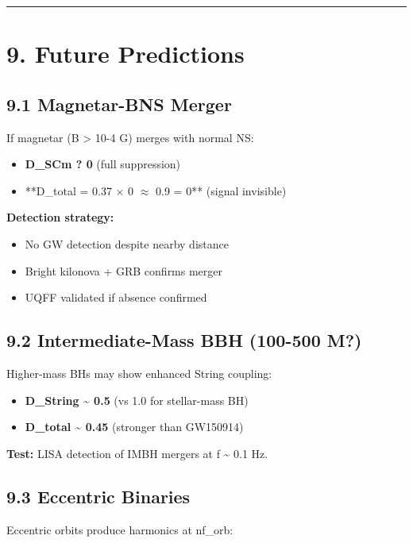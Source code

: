 \documentclass[11pt]{article}
\begin{document}
\noindent\rule{\textwidth}{0.4pt}

\section*{9. Future Predictions}

\subsection*{9.1 Magnetar-BNS Merger}

If magnetar (B > 10-4 G) merges with normal NS:

\begin{itemize}
  \item \textbf{D\_SCm ? 0} (full suppression)
  \item **D\_total = 0.37 $\times$ 0 $\approx$ 0.9 = 0** (signal invisible)
\end{itemize}

\textbf{Detection strategy:}

\begin{itemize}
  \item No GW detection despite nearby distance
  \item Bright kilonova + GRB confirms merger
  \item UQFF validated if absence confirmed
\end{itemize}

\subsection*{9.2 Intermediate-Mass BBH (100-500 M?)}

Higher-mass BHs may show enhanced String coupling:

\begin{itemize}
  \item \textbf{D\_String \textasciitilde{} 0.5} (vs 1.0 for stellar-mass BH)
  \item \textbf{D\_total \textasciitilde{} 0.45} (stronger than GW150914)
\end{itemize}

\textbf{Test:} LISA detection of IMBH mergers at f \textasciitilde{} 0.1 Hz.

\subsection*{9.3 Eccentric Binaries}

Eccentric orbits produce harmonics at nf\_orb:
\end{document}

